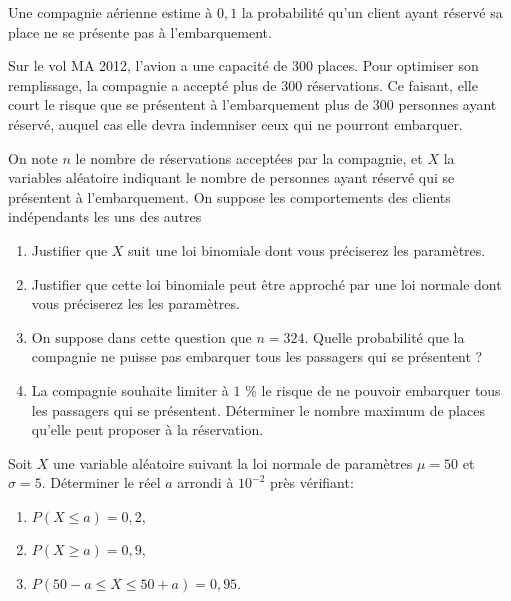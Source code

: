 \begin{exercice_cours}[\quad]{}
	Une compagnie aérienne estime à $0,1$ la probabilité qu’un
client ayant réservé sa place ne se présente pas à l’embarquement.

Sur le vol MA 2012, l’avion a une capacité de 300 places. Pour
optimiser son remplissage, la compagnie a accepté plus de
300 réservations. Ce faisant, elle court le risque que se présentent
à l’embarquement plus de 300 personnes ayant réservé,
auquel cas elle devra indemniser ceux qui ne pourront
embarquer.

On note $n$ le nombre de réservations acceptées par la compagnie,
et $X$ la variables aléatoire indiquant le nombre de
personnes ayant réservé qui se présentent à l’embarquement.
On suppose les comportements des clients indépendants
les uns des autres

\begin{enumerate}
	\item  Justifier que $X$ suit une loi binomiale dont vous préciserez
les paramètres.
	\item Justifier que cette loi binomiale peut être approché
par une loi normale dont vous préciserez les les paramètres.
	\item On suppose dans cette question que $n = 324$.
Quelle probabilité que la compagnie ne puisse pas embarquer
tous les passagers qui se présentent ?
	\item La compagnie souhaite limiter à $1$ \% le risque de
ne pouvoir embarquer tous les passagers qui se présentent.
Déterminer le nombre maximum de places qu’elle
peut proposer à la réservation.
\end{enumerate}
\end{exercice_cours}

\begin{exercice_cours}[\quad]{}

	Soit $X$ une variable aléatoire suivant la loi normale de paramètres $\mu=50$ et $\sigma=5$. Déterminer le réel $a$ arrondi à $10^{-2}$ près vérifiant:
\begin{enumerate}
	\item $P(X\leqslant a)=0,2$,
	\item $P(X\geqslant a)=0,9$,
	\item $P(50-a \leqslant X \leqslant 50+a)=0,95$.
\end{enumerate}
\end{exercice_cours}

